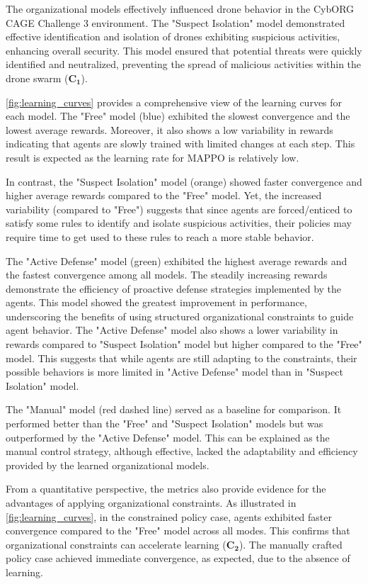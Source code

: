 The organizational models effectively influenced drone behavior in the CybORG CAGE Challenge 3 environment. The "Suspect Isolation" model demonstrated effective identification and isolation of drones exhibiting suspicious activities, enhancing overall security. This model ensured that potential threats were quickly identified and neutralized, preventing the spread of malicious activities within the drone swarm ($\mathbf{C_1}$).

\autoref{fig:learning_curves} provides a comprehensive view of the learning curves for each model. The "Free" model (blue) exhibited the slowest convergence and the lowest average rewards. Moreover, it also shows a low variability in rewards indicating that agents are slowly trained with limited changes at each step. This result is expected as the learning rate for MAPPO is relatively low.

In contrast, the "Suspect Isolation" model (orange) showed faster convergence and higher average rewards compared to the "Free" model. Yet, the increased variability (compared to "Free") suggests that since agents are forced/enticed to satisfy some rules to identify and isolate suspicious activities, their policies may require time to get used to these rules to reach a more stable behavior.

The "Active Defense" model (green) exhibited the highest average rewards and the fastest convergence among all models. The steadily increasing rewards demonstrate the efficiency of proactive defense strategies implemented by the agents. This model showed the greatest improvement in performance, underscoring the benefits of using structured organizational constraints to guide agent behavior. The "Active Defense" model also shows a lower variability in rewards compared to "Suspect Isolation" model but higher compared to the "Free" model. This suggests that while agents are still adapting to the constraints, their possible behaviors is more limited in "Active Defense" model than in "Suspect Isolation" model.

The "Manual" model (red dashed line) served as a baseline for comparison. It performed better than the "Free" and "Suspect Isolation" models but was outperformed by the "Active Defense" model. This can be explained as the manual control strategy, although effective, lacked the adaptability and efficiency provided by the learned organizational models.

From a quantitative perspective, the metrics also provide evidence for the advantages of applying organizational constraints. As illustrated in \autoref{fig:learning_curves}, in the constrained policy case, agents exhibited faster convergence compared to the "Free" model across all modes. This confirms that organizational constraints can accelerate learning ($\mathbf{C_2}$). The manually crafted policy case achieved immediate convergence, as expected, due to the absence of learning.

